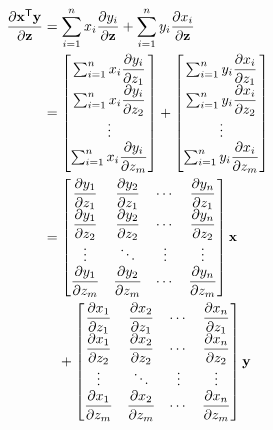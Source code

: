 \documentclass{article}
\newcommand{\trans}{\mathsf{T}}
\begin{document}
\begin{align}
    \dfrac{\partial \mathbf{x}^\trans \mathbf{y}}{\partial \mathbf{z}} & = \sum_{i=1}^{n} x_i\dfrac{\partial y_i}{\partial \mathbf{z}} + \sum_{i=1}^{n} y_i\dfrac{\partial x_i}{\partial \mathbf{z}} \\
    & = \begin{bmatrix}
        \sum_{i=1}^{n} x_i\dfrac{\partial y_i}{\partial z_1} \\
        \sum_{i=1}^{n} x_i\dfrac{\partial y_i}{\partial z_2} \\
        \vdots \\
        \sum_{i=1}^{n} x_i\dfrac{\partial y_i}{\partial z_m} \\
    \end{bmatrix} +
    \begin{bmatrix}
        \sum_{i=1}^{n} y_i\dfrac{\partial x_i}{\partial z_1} \\
        \sum_{i=1}^{n} y_i\dfrac{\partial x_i}{\partial z_2} \\
        \vdots \\
        \sum_{i=1}^{n} y_i\dfrac{\partial x_i}{\partial z_m}
    \end{bmatrix} \\
    & = \begin{bmatrix}
        \dfrac{\partial y_1}{\partial z_1} & \dfrac{\partial y_2}{\partial z_1} & \cdots & \dfrac{\partial y_n}{\partial z_1} \\
        \dfrac{\partial y_1}{\partial z_2} & \dfrac{\partial y_2}{\partial z_2} & \cdots & \dfrac{\partial y_n}{\partial z_2} \\
        \vdots & \ddots & \vdots & \vdots \\
        \dfrac{\partial y_1}{\partial z_m} & \dfrac{\partial y_2}{\partial z_m} & \cdots & \dfrac{\partial y_n}{\partial z_m} \\
    \end{bmatrix} \mathbf{x} \\
    & \hspace{2.5ex} + \begin{bmatrix}
        \dfrac{\partial x_1}{\partial z_1} & \dfrac{\partial x_2}{\partial z_1} & \cdots & \dfrac{\partial x_n}{\partial z_1} \\
        \dfrac{\partial x_1}{\partial z_2} & \dfrac{\partial x_2}{\partial z_2} & \cdots & \dfrac{\partial x_n}{\partial z_2} \\
        \vdots & \ddots & \vdots & \vdots \\
        \dfrac{\partial x_1}{\partial z_m} & \dfrac{\partial x_2}{\partial z_m} & \cdots & \dfrac{\partial x_n}{\partial z_m} \\
    \end{bmatrix} \mathbf{y}
\end{align}
\end{document}
